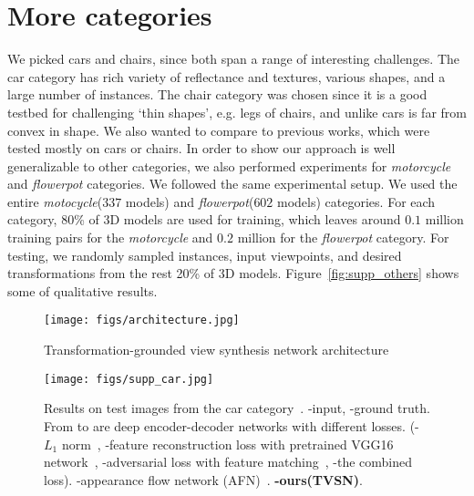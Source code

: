 \documentclass[10pt,twocolumn,letterpaper]{article}
\begin{document}
\section{More categories}
We picked cars and chairs, since both span a range of interesting challenges.  The car category has rich variety of reflectance and textures, various shapes, and a large number of instances. The chair category was chosen since it is a good testbed for challenging `thin shapes', e.g. legs of chairs, and unlike cars is far from convex in shape. We also wanted to compare to previous works, which were tested mostly on cars or chairs. In order to show our approach is well generalizable to other categories, we also performed experiments for \emph{motorcycle} and \emph{flowerpot} categories. We followed the same experimental setup. We used the entire \emph{motocycle}($337$ models) and \emph{flowerpot}($602$ models) categories. For each category, 80\% of 3D models are used for training, which leaves around $0.1$ million training pairs for the \emph{motorcycle} and $0.2$ million for the \emph{flowerpot} category. For testing, we randomly sampled instances, input viewpoints, and desired transformations from the rest 20\% of 3D models. Figure~\ref{fig:supp_others} shows some of qualitative results.


\begin{figure*}[t]
\begin{center}
\texttt{[image: figs/architecture.jpg]}
\end{center}
\caption{Transformation-grounded view synthesis network architecture}
\label{fig:architecture}
\end{figure*}

\begin{figure*}[t]
\begin{center}
\texttt{[image: figs/supp\_car.jpg]}
\end{center}
\caption{Results on test images from the car category~\cite{shapenet2015}. -input, -ground truth. From  to  are deep encoder-decoder networks with different losses. (-$L_1$ norm~\cite{tatarchenko_eccv2016}, -feature reconstruction loss with pretrained VGG16 network~\cite{johnson_eccv2016,larsen_icml2016,ulyanov_icml2016,lamb2016discriminative}, -adversarial loss with feature matching~\cite{Goodfellow_nips2014,Radford_iclr2016,salimans_nips2016}, -the combined loss). -appearance flow network (AFN)~\cite{Zhou_eccv2016}. \textbf{-ours(TVSN)}.}
\label{fig:supp_car}
\end{figure*}
\end{document}
